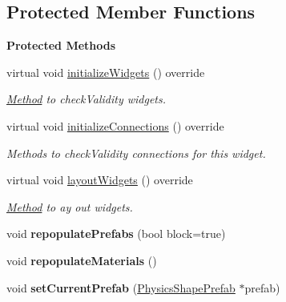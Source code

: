 \subsection*{Protected Member Functions}
\begin{Indent}\textbf{ Protected Methods}\par
\begin{DoxyCompactItemize}
\item 
\mbox{\label{classrev_1_1_view_1_1_physics_shape_widget_a868aeb0547ecb3bff4fa7c677045c415}} 
virtual void \mbox{\hyperlink{classrev_1_1_view_1_1_physics_shape_widget_a868aeb0547ecb3bff4fa7c677045c415}{initialize\+Widgets}} () override
\begin{DoxyCompactList}\small\item\em \mbox{\hyperlink{struct_method}{Method}} to check\+Validity widgets. \end{DoxyCompactList}\item 
\mbox{\label{classrev_1_1_view_1_1_physics_shape_widget_ab3e4e7e57ad9ed3eac9dcd334d494acd}} 
virtual void \mbox{\hyperlink{classrev_1_1_view_1_1_physics_shape_widget_ab3e4e7e57ad9ed3eac9dcd334d494acd}{initialize\+Connections}} () override
\begin{DoxyCompactList}\small\item\em Methods to check\+Validity connections for this widget. \end{DoxyCompactList}\item 
\mbox{\label{classrev_1_1_view_1_1_physics_shape_widget_aaa6a3d651b2e2ea8063c7d20893d0079}} 
virtual void \mbox{\hyperlink{classrev_1_1_view_1_1_physics_shape_widget_aaa6a3d651b2e2ea8063c7d20893d0079}{layout\+Widgets}} () override
\begin{DoxyCompactList}\small\item\em \mbox{\hyperlink{struct_method}{Method}} to ay out widgets. \end{DoxyCompactList}\item 
\mbox{\label{classrev_1_1_view_1_1_physics_shape_widget_a6d9c430c8d9d305997807721d58adb04}} 
void {\bfseries repopulate\+Prefabs} (bool block=true)
\item 
\mbox{\label{classrev_1_1_view_1_1_physics_shape_widget_ad429cf63eacc268a8ece6820b20e3e1d}} 
void {\bfseries repopulate\+Materials} ()
\item 
\mbox{\label{classrev_1_1_view_1_1_physics_shape_widget_abd453acb8e2e420d22e2c63b86574942}} 
void {\bfseries set\+Current\+Prefab} (\mbox{\hyperlink{classrev_1_1_physics_shape_prefab}{Physics\+Shape\+Prefab}} $\ast$prefab)
\end{DoxyCompactItemize}
\end{Indent}
